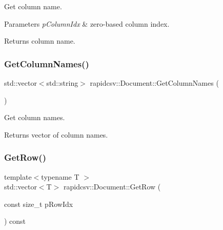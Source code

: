 Get column name. 


\begin{DoxyParams}{Parameters}
{\em p\+Column\+Idx} & zero-\/based column index. \\
\hline
\end{DoxyParams}
\begin{DoxyReturn}{Returns}
column name. 
\end{DoxyReturn}
\mbox{\label{classrapidcsv_1_1Document_a90c8562f50d27cae80623ba9bbfd3d95}} 
\subsubsection{\texorpdfstring{Get\+Column\+Names()}{GetColumnNames()}}
{\footnotesize\ttfamily std\+::vector$<$std\+::string$>$ rapidcsv\+::\+Document\+::\+Get\+Column\+Names (\begin{DoxyParamCaption}{ }\end{DoxyParamCaption})\hspace{0.3cm}{\ttfamily [inline]}}



Get column names. 

\begin{DoxyReturn}{Returns}
vector of column names. 
\end{DoxyReturn}
\mbox{\label{classrapidcsv_1_1Document_a1523dd4eab5d7268f5c7a64867001595}} 
\subsubsection{\texorpdfstring{Get\+Row()}{GetRow()}\hspace{0.1cm}{\footnotesize\ttfamily [1/4]}}
{\footnotesize\ttfamily template$<$typename T $>$ \\
std\+::vector$<$T$>$ rapidcsv\+::\+Document\+::\+Get\+Row (\begin{DoxyParamCaption}\item[{const size\+\_\+t}]{p\+Row\+Idx }\end{DoxyParamCaption}) const\hspace{0.3cm}{\ttfamily [inline]}}



